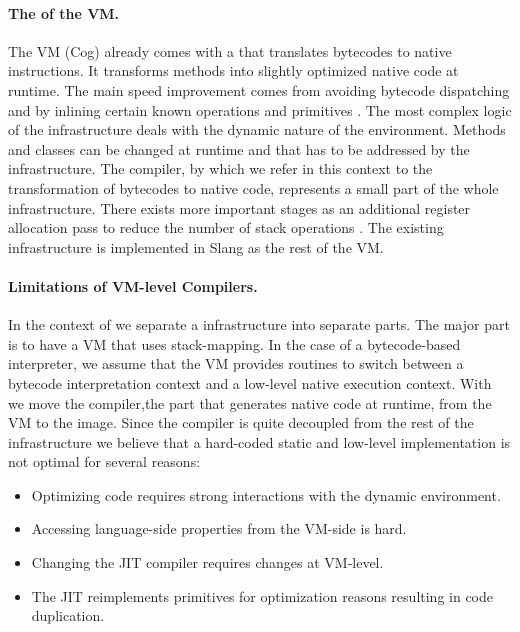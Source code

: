 \paragraph{The \JIT of the \PH VM.}
The \PH VM (Cog) already comes with a \JIT that translates bytecodes to native instructions.
It transforms \ST methods into slightly optimized native code at runtime.
The main speed improvement comes from avoiding bytecode dispatching and by inlining certain known operations and primitives \cite{Ayco03a}.
The most complex logic of the \JIT infrastructure deals with the dynamic nature of the \ST environment.
Methods and classes can be changed at runtime and that has to be addressed by the \JIT infrastructure.
The \JIT compiler, by which we refer in this context to the transformation of bytecodes to native code, represents a small part of the whole infrastructure.
There exists more important stages as an additional register allocation pass to reduce the number of stack operations \cite{Mira99a,Mira11a}.
The existing \JIT infrastructure is implemented in Slang \cite[Ch.\ 5]{Blac09a} as the rest of the VM.

\paragraph{Limitations of VM-level \JIT Compilers.}
In the context of \NBJ we separate a \JIT infrastructure into separate parts.
The major part is to have a VM that uses stack-mapping.
In the case of a bytecode-based interpreter, we assume that the VM provides routines to switch between a bytecode interpretation context and a low-level native execution context.
With \NBJ we move the \JIT compiler,the part that generates native code at runtime, from the VM to the image.%
 Since the \JIT compiler is quite decoupled from the rest of the \JIT infrastructure we believe that a hard-coded static and low-level implementation is not optimal for several reasons:

\begin{itemize}
	\item Optimizing \ST code requires strong interactions with the dynamic environment.
	\item Accessing language-side properties from the VM-side is hard.
	\item Changing the JIT compiler requires changes at VM-level.
	\item The JIT reimplements primitives for optimization reasons resulting in code duplication.
\end{itemize}

